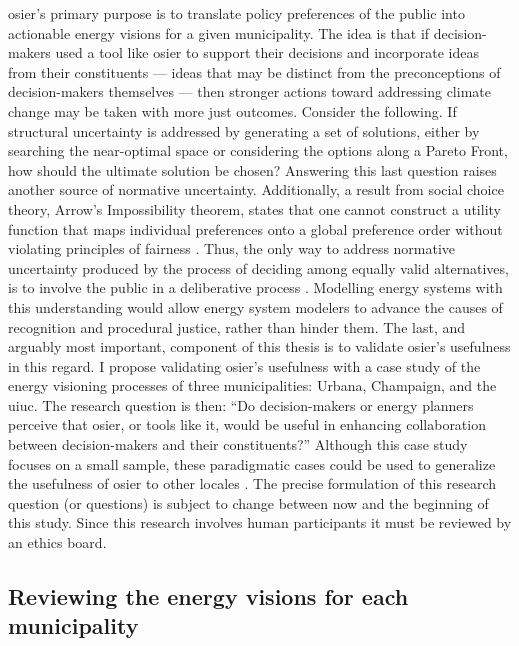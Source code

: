\ac{osier}'s primary purpose is to translate policy preferences of the
public into actionable energy visions for a given municipality. The idea is
that if decision-makers used a tool like \ac{osier} to support their decisions
and incorporate ideas from their constituents --- ideas that may be distinct
from the preconceptions of decision-makers themselves --- then stronger actions
toward addressing climate change may be taken with more just outcomes. Consider
the following. If structural uncertainty is addressed by generating a set of
solutions, either by searching the near-optimal space or considering the options
along a Pareto Front, how should the ultimate solution be chosen? Answering this
last question raises another source of normative uncertainty. Additionally, a
result from social choice theory, Arrow's Impossibility theorem, states that one
cannot construct a utility function that maps individual preferences onto a
global preference order without violating principles of fairness
\cite{arrow_difficulty_1950, kasprzyk_many_2013,franssen_arrows_2005}. Thus, the
only way to address normative uncertainty produced by the process of deciding
among equally valid alternatives, is to involve the public in a deliberative
process \cite{dryzek_deliberative_2013}. Modelling energy systems with this
understanding would allow energy system modelers to advance the causes of
recognition and procedural justice, rather than hinder them. The last, and
arguably most important, component of this thesis is to validate \ac{osier}'s
usefulness in this regard. I propose validating \ac{osier}'s usefulness with a
case study of the energy visioning processes of three municipalities: Urbana,
Champaign, and the \ac{uiuc}. The research question is then: ``Do
decision-makers or energy planners perceive that \ac{osier}, or tools like it,
would be useful in enhancing collaboration between decision-makers and their
constituents?'' Although this case study focuses on a small sample, these
paradigmatic cases could be used to generalize the usefulness of \ac{osier} to
other locales \cite{flyvbjerg_five_2006}. The precise formulation of this
research question (or questions) is subject to change between now and the
beginning of this study. Since this research involves human participants it must
be reviewed by an ethics board.

\subsection{Reviewing the energy visions for each municipality}

